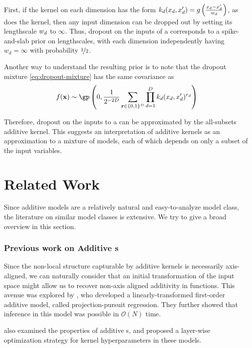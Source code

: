 First, if the kernel on each dimension has the form ${k_d(x_d, x_d') = g \left( \frac{x_d - x_d'}{w_d} \right)}$, as does the \kSE{} kernel, then any input dimension can be dropped out by setting its lengthscale $w_d$ to $\infty$.
Thus, dropout on the inputs of a \gp{} corresponds to a spike-and-slab prior on lengthscales, with each dimension independently having $w_d = \infty$ with probability $\nicefrac{1}{2}$.

Another way to understand the resulting prior is to note that the dropout mixture \eqref{eq:dropout-mixture} has the same covariance as
\begin{align}
f(\vx) \sim \textnormal{\gp} \left(0, \frac{1}{2^{-2D}} \sum_{\vr \in \{0,1\}^D}  \prod_{d=1}^D k_d(x_d, x_d')^{r_d} \right)
\label{eq:additive-gps}
\end{align}

Therefore, dropout on the inputs to a \gp{} can be approximated by the all-subsets additive kernel.
This suggests an interpretation of additive kernels as an approximation to a mixture of models, each of which depends on only a subset of the input variables.





\section{Related Work}

Since additive models are a relatively natural and easy-to-analyze model class, the literature on similar model classes is extensive.
We try to give a broad overview in this section.

\subsubsection{Previous work on Additive \sgp{}s}

Since the non-local structure capturable by additive kernels is necessarily axis-aligned, we can naturally consider that an initial transformation of the input space might allow us to recover non-axis aligned additivity in functions.
This avenue was explored by \citet{gilboa2013scaling}, who developed a linearly-transformed first-order additive \gp{} model, called projection-pursuit \gp{} regression.  They further showed that inference in this model was possible in $\mathcal{O}(N)$ time.

\citet{durrande2011additive} also examined the properties of additive \gp{}s, and proposed a layer-wise optimization strategy for kernel hyperparameters in these models.

